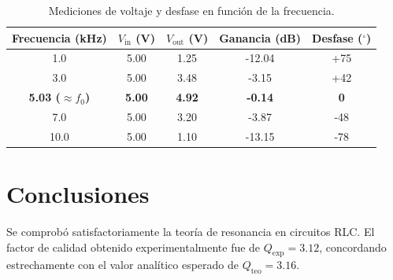 \documentclass[11pt, letterpaper]{article}
\begin{document}
\begin{table}[h]
  \centering
  \caption{Mediciones de voltaje y desfase en función de la frecuencia.}
  \vspace{0.2cm}
  \begin{tabular}{ccccc}
    \toprule
    \textbf{Frecuencia (kHz)} & \textbf{$V_{\text{in}}$ (V)} & \textbf{$V_{\text{out}}$ (V)} & \textbf{Ganancia (dB)} & \textbf{Desfase ($^\circ$)} \\
    \midrule
    1.0 & 5.00 & 1.25 & -12.04 & +75 \\
    3.0 & 5.00 & 3.48 & -3.15 & +42 \\
    \textbf{5.03 ($\approx f_0$)} & \textbf{5.00} & \textbf{4.92} & \textbf{-0.14} & \textbf{0} \\
    7.0 & 5.00 & 3.20 & -3.87 & -48 \\
    10.0 & 5.00 & 1.10 & -13.15 & -78 \\
    \bottomrule
  \end{tabular}
\end{table}

\section{Conclusiones}
Se comprobó satisfactoriamente la teoría de resonancia en circuitos RLC. El factor de calidad obtenido experimentalmente fue de $Q_{\text{exp}} = 3.12$, concordando estrechamente con el valor analítico esperado de $Q_{\text{teo}} = 3.16$.
\end{document}
